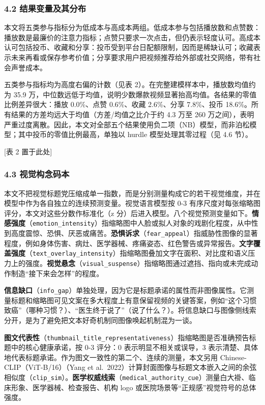 \documentclass[
  fontset=none]{ctexart}
\begin{document}
\subsubsection{4.2 结果变量及其分布}\label{ux7ed3ux679cux53d8ux91cfux53caux5176ux5206ux5e03}

本文将五类参与指标分为低成本与高成本两组。低成本参与包括播放数和点赞数：播放数是最廉价的注意力指标；点赞只要求一次点击，但仍表示轻度认可。高成本认可包括投币、收藏和分享：投币受到平台日配额限制，因而是稀缺认可；收藏表示未来再看或保存参考价值；分享要求用户把视频推荐给外部或社交网络，带有社会声誉成本。

五类参与指标均为高度右偏的计数（见表 2）。在完整建模样本中，播放数均值约为 35.9 万，中位数远低于均值，说明少数爆款视频显著抬高均值。各结果的零值比例差异很大：播放 0.0\%、点赞 0.6\%、收藏 2.6\%、分享 7.8\%、投币 18.6\%。所有结果的方差均远大于均值（方差/均值之比介于约 4.3 万至 260 万之间），表明严重过度离散。因此，本文对全部五个结果使用负二项（NB）模型，而非泊松模型；其中投币的零值比例最高，单独以 hurdle 模型处理其零过程（见 4.6 节）。

{[}表 2 置于此处{]}

\subsubsection{4.3 视觉构念码本}\label{ux89c6ux89c9ux6784ux5ff5ux7801ux672c}

本文不把视觉标题党压缩成单一指数，而是分别测量构成它的若干视觉维度，并在模型中作为各自独立的连续预测变量。视觉语言模型按 0-3 有序尺度对每张缩略图评分，本文对这些分数作标准化（z 分）后进入模型。八个视觉预测变量如下。\textbf{情感强度}（\texttt{emotion\_intensity}）指缩略图中人脸或拟人对象的戏剧化程度，从中性到高度震惊、恐惧、厌恶或痛苦。\textbf{恐惧诉求}（\texttt{fear\_appeal}）指威胁性图像的显著程度，例如身体伤害、病灶、医学器械、疼痛姿态、红色警告或异常报告。\textbf{文字覆盖强度}（\texttt{text\_overlay\_intensity}）指缩略图叠加文字在面积、对比度和语义压力上的强度。\textbf{视觉悬念}（\texttt{visual\_suspense}）指缩略图通过遮挡、指向或未完成动作制造``接下来会怎样''的程度。

\textbf{信息缺口}（\texttt{info\_gap}）单独处理，因为它是标题承诺的属性而非图像属性。它测量标题和缩略图可见文案在多大程度上有意保留视频的关键答案，例如``这个习惯致癌''（哪种习惯？）、``医生终于说了''（说了什么？）。将信息缺口与图像侧线索分开，是为了避免把文本好奇机制同图像唤起机制混为一谈。

\textbf{图文代表性}（\texttt{thumbnail\_title\_representativeness}）指缩略图是否准确预告标题中的核心健康承诺，按 0-3 评分：0 表示明显不相关或误导，3 表示清楚、具体地代表标题承诺。作为图文一致性的第二个、连续的测量，本文另用 Chinese-CLIP（ViT-B/16）（Yang et al.~2022）计算封面图像与标题文本嵌入之间的余弦相似度（\texttt{clip\_sim}）。\textbf{医学权威线索}（\texttt{medical\_authority\_cue}）测量白大褂、临床形象、医学器械、检查报告、机构 logo 或医院场景等``正规感''视觉符号的总体强度。
\end{document}
